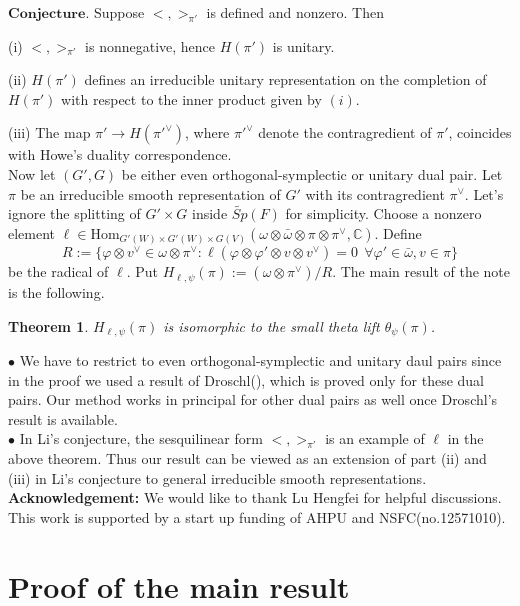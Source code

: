 \documentclass[twoside]{amsart}
\newcommand{\BC}{{\mathbb {C}}} \newcommand{\BD}{{\mathbb {D}}}
\newcommand{\Hom}{{\mathrm{Hom}}} \renewcommand{\Im}{{\mathrm{Im}}}
\theoremstyle{plain}
\newtheorem{thm}{Theorem}[section] \newtheorem{corollary}[thm]{Corollary}
\numberwithin{equation}{section}
\begin{document}
$\mathbf{Conjecture}$. Suppose $<,>_{\pi'}$ is defined and nonzero. Then

(i) $<,>_{\pi'}$ is nonnegative, hence $H(\pi')$ is unitary.

(ii) $H(\pi')$ defines an irreducible unitary representation on the completion of $H(\pi')$ with respect to the inner product given by $(i)$.

(iii) The map $\pi'\to H(\pi'^\vee)$, where $\pi'^\vee$ denote the contragredient of $\pi'$, coincides with Howe's duality correspondence.  \\

Now let $(G',G)$ be either even orthogonal-symplectic or unitary dual pair. Let $\pi$ be an irreducible smooth representation of $G'$ with its contragredient $\pi^\vee$. Let's ignore the splitting of $G'\times G$ inside $\tilde{Sp}(F)$ for simplicity. Choose a nonzero element $\ell\in \Hom_{G'(W)\times G'(W)\times G(V)} (\omega\otimes \bar{\omega} \otimes \pi \otimes \pi^\vee , \BC)$. Define
\[
R:=\{ \varphi\otimes v^\vee\in \omega\otimes \pi^\vee: \ell(\varphi\otimes \varphi'\otimes v\otimes v^\vee)=0 \ \ \forall \varphi'\in \bar{\omega}, v\in \pi  \}
\]
be the radical of $\ell$. Put $H_{\ell,\psi}(\pi):= (\omega\otimes \pi^\vee)/R$.
The main result of the note is the following.
\begin{thm}
 $ H_{\ell,\psi}(\pi)$ is isomorphic to the small theta lift $\theta_\psi(\pi)$.
\end{thm}

$\bullet$ We have to restrict to even orthogonal-symplectic and unitary daul pairs since in the proof we used a result of Droschl(\cite{D23}), which is proved only for these dual pairs. Our method works in principal for other dual pairs as well once Droschl's result is available. \\

$\bullet$ In Li's conjecture, the sesquilinear form $<,>_{\pi'}$ is an example of $\ell$ in the above theorem. Thus our result can be viewed as an extension of part (ii) and (iii) in Li's conjecture to general irreducible smooth representations.  \\

\noindent \textbf{Acknowledgement:} We would like to thank Lu Hengfei for helpful discussions. This work is supported by a start up funding of AHPU and NSFC(no.12571010).
\\

\section{Proof of the main result}
\end{document}
